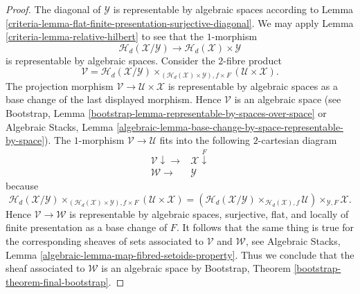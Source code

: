 \begin{proof}
\medskip\noindent
The diagonal of $\mathcal{Y}$ is representable by algebraic spaces according to
Lemma \ref{criteria-lemma-flat-finite-presentation-surjective-diagonal}.
We may apply
Lemma \ref{criteria-lemma-relative-hilbert}
to see that the $1$-morphism
$$
\mathcal{H}_d(\mathcal{X}/\mathcal{Y})
\longrightarrow
\mathcal{H}_d(\mathcal{X}) \times \mathcal{Y}
$$
is representable by algebraic spaces. Consider the $2$-fibre product
$$
\mathcal{V} =
\mathcal{H}_d(\mathcal{X}/\mathcal{Y})
\times_{(\mathcal{H}_d(\mathcal{X}) \times \mathcal{Y}), f \times F}
(\mathcal{U} \times \mathcal{X}).
$$
The projection morphism $\mathcal{V} \to \mathcal{U} \times \mathcal{X}$
is representable by algebraic spaces as a base change of the last
displayed morphism. Hence $\mathcal{V}$ is an algebraic space (see
Bootstrap, Lemma \ref{bootstrap-lemma-representable-by-spaces-over-space}
or
Algebraic Stacks,
Lemma \ref{algebraic-lemma-base-change-by-space-representable-by-space}).
The $1$-morphism $\mathcal{V} \to \mathcal{U}$ fits into the following
$2$-cartesian diagram
$$
\begin{array}{cc}\mathcal{V} \downarrow\longrightarrow & \mathcal{X} \overset{F}{\downarrow} \\ \mathcal{W} \longrightarrow & \mathcal{Y}\end{array}
$$
because
$$
\mathcal{H}_d(\mathcal{X}/\mathcal{Y})
\times_{(\mathcal{H}_d(\mathcal{X}) \times \mathcal{Y}), f \times F}
(\mathcal{U} \times \mathcal{X})
=
(\mathcal{H}_d(\mathcal{X}/\mathcal{Y})
\times_{\mathcal{H}_d(\mathcal{X}), f}
\mathcal{U}) \times_{\mathcal{Y}, F} \mathcal{X}.
$$
Hence $\mathcal{V} \to \mathcal{W}$ is representable by algebraic spaces,
surjective, flat, and locally of finite presentation as a base change
of $F$. It follows that the same thing is true for the corresponding
sheaves of sets associated to $\mathcal{V}$ and $\mathcal{W}$, see
Algebraic Stacks, Lemma \ref{algebraic-lemma-map-fibred-setoids-property}.
Thus we conclude that the sheaf associated to $\mathcal{W}$ is an
algebraic space by
Bootstrap, Theorem \ref{bootstrap-theorem-final-bootstrap}.
\end{proof}


